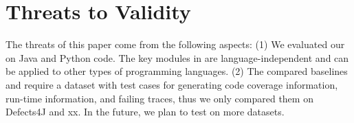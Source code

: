 \section{Threats to Validity}
The threats of this paper come from the following aspects: 
(1) We evaluated our {\tool} on Java and Python code. The key modules in {\tool} are language-independent and can be applied to other types of programming languages. 
(2) The compared baselines and {\tool} require a dataset with test cases for generating code coverage information, run-time information, and failing traces, thus we only compared them on Defects4J and xx. In the future, we plan to test {\tool} on more datasets. 

